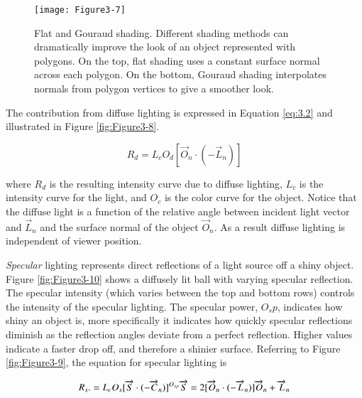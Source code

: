 \begin{figure}[!htb]
  \centering
  \texttt{[image: Figure3-7]}\\
  \caption{Flat and Gouraud shading. Different shading methods can dramatically improve the look of an object represented with polygons. On the top, flat shading uses a constant surface normal across each polygon. On the bottom, Gouraud shading interpolates normals from polygon vertices to give a smoother look.}\label{fig:Figure3-7}
\end{figure}

The contribution from diffuse lighting is expressed in Equation \ref{eq:3.2} and illustrated in Figure \ref{fig:Figure3-8}.

\begin{equation}\label{eq:3.2}
  R_d = L_cO_d[\overrightarrow{O}_n \cdot (-\overrightarrow{L}_n)]
\end{equation}

where $R_d$ is the resulting intensity curve due to diffuse lighting, $L_c$ is the intensity curve for the light, and $O_c$ is the color curve for the object. Notice that the diffuse light is a function of the relative angle between incident light vector and $\overrightarrow{L}_n$ and the surface normal of the object $\overrightarrow{O}_n$. As a result diffuse lighting is independent of viewer position.

\emph{Specular} lighting represents direct reflections of a light source off a shiny object. Figure \ref{fig:Figure3-10} shows a diffusely lit ball with varying specular reflection. The specular intensity (which varies between the top and bottom rows) controls the intensity of the specular lighting. The specular power, $O_sp$, indicates how shiny an object is, more specifically it indicates how quickly specular reflections diminish as the reflection angles deviate from a perfect reflection. Higher values indicate a faster drop off, and therefore a shinier surface. Referring to Figure \ref{fig:Figure3-9}, the equation for specular lighting is

\begin{equation}\label{eq:3.3}
  R_s . = L_cO_s[\overrightarrow{S} \cdot (-\overrightarrow{C}_n)] ^{O_{sp}}\\
\overrightarrow{S} = 2[\overrightarrow{O}_n \cdot (-\overrightarrow{L}_n)]\overrightarrow{O}_n + \overrightarrow{L}_n
\end{equation}

